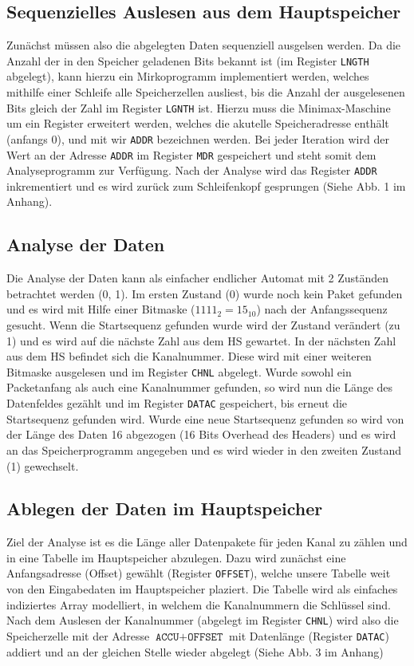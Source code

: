 \documentclass[12pt,titlepage]{article}
\begin{document}
\subsection{Sequenzielles Auslesen aus dem Hauptspeicher}
Zun{\"a}chst m{\"u}ssen also die abgelegten Daten sequenziell ausgelsen werden. Da die Anzahl der in den Speicher geladenen Bits
bekannt ist (im Register \texttt{LNGTH} abgelegt), kann hierzu ein Mirkoprogramm implementiert werden, welches mithilfe
einer Schleife alle Speicherzellen ausliest, bis die Anzahl der ausgelesenen Bits gleich der Zahl im Register \texttt{LGNTH} ist.
Hierzu muss die Minimax-Maschine um ein Register erweitert werden, welches die akutelle Speicheradresse enth{\"a}lt (anfangs 0),
und mit wir \texttt{ADDR} bezeichnen werden. Bei jeder Iteration wird der Wert an der Adresse \texttt{ADDR} im Register 
\texttt{MDR} gespeichert und steht somit dem Analyseprogramm zur Verf{\"u}gung. Nach der Analyse wird das Register \texttt{ADDR}
inkrementiert und es wird zur{\"u}ck zum Schleifenkopf gesprungen (Siehe Abb. 1 im Anhang).

\subsection{Analyse der Daten}
Die Analyse der Daten kann als einfacher endlicher Automat mit 2 Zuständen betrachtet werden (0, 1). Im ersten Zustand (0)
wurde noch kein Paket gefunden und es wird mit Hilfe einer Bitmaske ($1111_{2} = 15_{10}$) nach der Anfangssequenz gesucht. 
Wenn die Startsequenz gefunden wurde wird der Zustand verändert (zu 1) und es wird auf die nächste Zahl aus dem HS gewartet. 
In der nächsten Zahl aus dem HS befindet sich die Kanalnummer. Diese wird mit einer weiteren Bitmaske ausgelesen
und im Register \texttt{CHNL} abgelegt.
Wurde sowohl ein Packetanfang als auch eine Kanalnummer gefunden, so wird nun die Länge des Datenfeldes gezählt und im Register \texttt{DATAC} gespeichert, bis erneut die Startsequenz gefunden wird.
Wurde eine neue Startsequenz gefunden so wird von der Länge des Daten 16 abgezogen (16 Bits Overhead des Headers) und
es wird an das Speicherprogramm angegeben und es wird wieder in den zweiten Zustand (1) gewechselt.

\subsection{Ablegen der Daten im Hauptspeicher}
Ziel der Analyse ist es die Länge aller Datenpakete für jeden Kanal zu z{\"a}hlen und in eine Tabelle im Hauptspeicher abzulegen.
Dazu wird zunächst eine Anfangsadresse (Offset) gewählt (Register \texttt{OFFSET}), welche unsere Tabelle weit von den Eingabedaten
im Hauptspeicher plaziert. Die Tabelle wird als einfaches indiziertes Array modelliert, in welchem die Kanalnummern die
Schlüssel sind. Nach dem Auslesen der Kanalnummer (abgelegt im Register \texttt{CHNL}) wird also die Speicherzelle mit der Adresse 
$\texttt{ACCU} + \texttt{OFFSET}$ mit Datenlänge (Register \texttt{DATAC}) addiert und an der gleichen Stelle wieder abgelegt (Siehe
Abb. 3 im Anhang)
\end{document}
